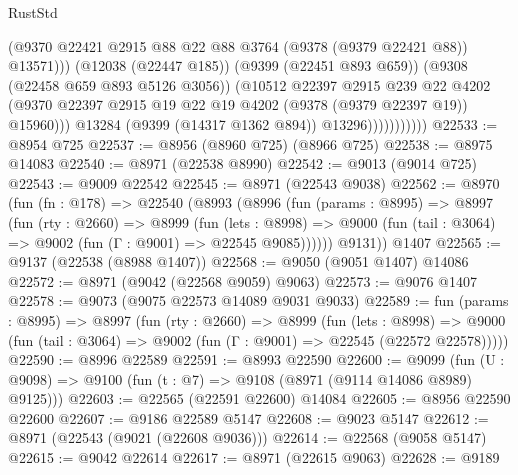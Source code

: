 \begin{lexlean}{RustStd}
\begin{coremodule}
                                (@9370
                                  @22421
                                  @2915
                                  @88
                                  @22
                                  @88
                                  @3764
                                  (@9378 (@9379 @22421 @88))
                                  @13571)))
                            (@12038 (@22447 @185))
                            (@9399 (@22451 @893 @659))
                            (@9308 (@22458 @659 @893 @5126 @3056))
                            (@10512
                              @22397
                              @2915
                              @239
                              @22
                              @4202
                              (@9370
                                @22397
                                @2915
                                @19
                                @22
                                @19
                                @4202
                                (@9378 (@9379 @22397 @19))
                                @15960)))
                          @13284
                          (@9399 (@14317 @1362 @894))
                          @13296)))))))))))
@22533 := @8954 @725
@22537 := @8956 (@8960 @725) (@8966 @725)
@22538 := @8975 @14083
@22540 := @8971 (@22538 @8990)
@22542 := @9013 (@9014 @725)
@22543 := @9009 @22542
@22545 := @8971 (@22543 @9038)
@22562 := @8970
    (fun (fn : @178) =>
    @22540
      (@8993
        (@8996
          (fun (params : @8995) =>
          @8997
            (fun (rty : @2660) =>
            @8999
              (fun (lets : @8998) =>
              @9000 (fun (tail : @3064) => @9002 (fun (Γ : @9001) => @22545 @9085))))))
        @9131))
    @1407
@22565 := @9137 (@22538 (@8988 @1407))
@22568 := @9050 (@9051 @1407) @14086
@22572 := @8971 (@9042 (@22568 @9059) @9063)
@22573 := @9076 @1407
@22578 := @9073 (@9075 @22573 @14089 @9031 @9033)
@22589 := fun (params : @8995) =>
  @8997
    (fun (rty : @2660) =>
    @8999
      (fun (lets : @8998) =>
      @9000 (fun (tail : @3064) => @9002 (fun (Γ : @9001) => @22545 (@22572 @22578)))))
@22590 := @8996 @22589
@22591 := @8993 @22590
@22600 := @9099
    (fun (U : @9098) => @9100 (fun (t : @7) => @9108 (@8971 (@9114 @14086 @8989) @9125)))
@22603 := @22565 (@22591 @22600) @14084
@22605 := @8956 @22590 @22600
@22607 := @9186 @22589 @5147
@22608 := @9023 @5147
@22612 := @8971 (@22543 (@9021 (@22608 @9036)))
@22614 := @22568 (@9058 @5147)
@22615 := @9042 @22614
@22617 := @8971 (@22615 @9063)
@22628 := @9189

\end{coremodule}
\end{lexlean}
